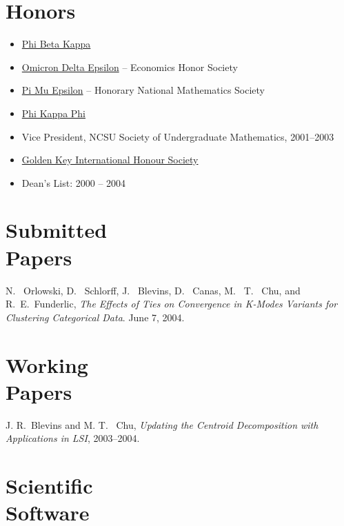 \documentclass[margin,line,11pt,final]{res}
\begin{document}
\begin{resume}
\section{\sc Honors}
\begin{itemize}
\item \href{http://www.pbk.org/}{Phi Beta Kappa}
\item \href{http://www.cba.ua.edu/~ode/}
  {Omicron Delta Epsilon} -- Economics Honor Society
\item \href{http://www.pme-math.org/}
  {Pi Mu Epsilon} -- Honorary National Mathematics Society
\item \href{http://www.phikappaphi.org/}{Phi Kappa Phi}
\item Vice President, NCSU Society of Undergraduate Mathematics, 2001--2003
\item \href{www.goldenkey.org}{Golden Key International Honour Society}
\item Dean's List: 2000 -- 2004
\end{itemize}


\section{\sc Submitted \\Papers}

N. \ Orlowski, D. \ Schlorff, J. \ Blevins, D. \ Canas, M. \ T. \ Chu,
and R.\ E.\ Funderlic, {\em The Effects of Ties on Convergence in
K-Modes Variants for Clustering Categorical Data}. June 7, 2004.


\section{\sc Working \\Papers}

J. R.\ Blevins and M. T. \ Chu, {\em Updating the Centroid
Decomposition with Applications in LSI}, 2003--2004.



\section{\sc Scientific \\Software}


\end{resume}
\end{document}
